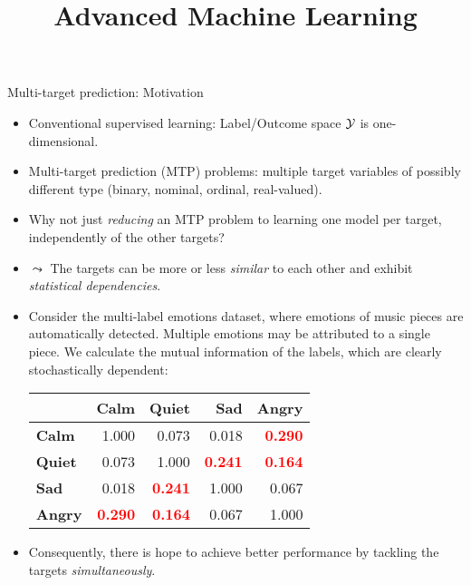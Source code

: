 \documentclass[11pt,compress,t,notes=noshow, xcolor=table]{beamer}
\title{Advanced Machine Learning}
\date{}
\begin{document}



\sloppy

\begin{vbframe}{Multi-target prediction: Motivation}
\scriptsize{
    \begin{itemize}    
        \item Conventional supervised learning: Label/Outcome space $\mathcal{Y}$ is one-dimensional.	

            \item Multi-target prediction (MTP) problems: multiple target variables of possibly different type (binary, nominal, ordinal, real-valued).
            
            \item Why not just \emph{reducing} an MTP problem to learning one model per target, independently of the other targets? 
        \hfill

		\item $\leadsto$ The targets can be more or less \emph{similar} to each other and exhibit \emph{statistical dependencies}.

        \item Consider the multi-label emotions dataset, where emotions of music pieces are automatically detected. Multiple emotions may be attributed to a single piece. We calculate the mutual information of the labels, which are clearly stochastically dependent:
        \vspace{10pt}
        \begin{center}
            \begin{tabular}{lrrrr}
\toprule
  & \textbf{Calm} & \textbf{Quiet} & \textbf{Sad} & \textbf{Angry}\\
\midrule
\textbf{Calm} & 1.000 & 0.073 & 0.018 & \textcolor{red}{\textbf{0.290}}\\
\textbf{Quiet} & 0.073 & 1.000 & \textcolor{red}{\textbf{0.241}} & \textcolor{red}{\textbf{0.164}}\\
\textbf{Sad} & 0.018 & \textcolor{red}{\textbf{0.241}} & 1.000 & 0.067\\
\textbf{Angry} & \textcolor{red}{\textbf{0.290}} & \textcolor{red}{\textbf{0.164}} & 0.067 & 1.000\\
\bottomrule
\end{tabular}
        \end{center}
	\vspace{10pt}
		\item Consequently, there is hope to achieve better performance by tackling the targets \emph{simultaneously}.

    \end{itemize}}

\end{vbframe}
\end{document}

